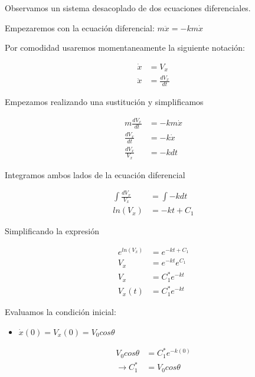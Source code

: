 Observamos un sistema desacoplado de dos ecuaciones diferenciales.

\vspace*{5 mm}

Empezaremos con la ecuación diferencial: $ m\ddot{x} = -km\dot{x} $

\vspace*{5 mm}

Por comodidad usaremos momentaneamente la siguiente notación: 

\begin{align*}
    \dot{x} &= V_{x} \\
    \ddot{x} &= \frac{dV_{x}}{dt}
\end{align*}

Empezamos realizando una sustitución y simplificamos

\begin{align*}
    m\frac{d V_{x}}{dt} &= -km\dot{x} \\
    \frac{d V_{x}}{dt} &= -k\dot{x} \\
    \frac{ d V_{x}}{V_{x}} &= -kdt 
\end{align*}

Integramos  ambos lados de la ecuación diferencial

\begin{align*}
    \int \frac{ d V_{x}}{V_{x}} &= \int -kdt \\
    ln(V_{x}) &= -kt+C_{1}
\end{align*}

Simplificando la expresión

\begin{align*}
    e^{ln(V_{x})} &= e^{-kt+C_{1}} \\
    V_{x} &= e^{-kt} e^{C_{1}} \\
    V_{x} &= C_{1}^{*}e^{-kt}  \\
    V_{x} (t) &= C_{1}^{*}e^{-kt}
\end{align*}

Evaluamos la condición inicial:

\begin{itemize}
    \item $\dot{x} (0) = V_{x} (0) = V_{0}cos \theta$
\end{itemize}

\begin{align*}
    V_{0}cos \theta &=  C_{1}^{*}e^{-k(0)} \\
    \rightarrow C_{1}^{*} &= V_{0}cos \theta
\end{align*}

